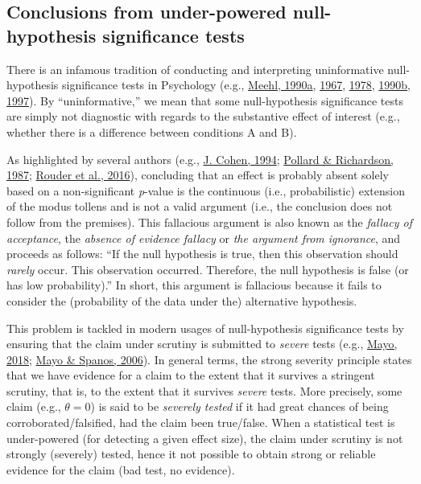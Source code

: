 \documentclass[
  english,
  man, donotrepeattitle,mask,floatsintext]{apa6}
\begin{document}
\hypertarget{conclusions-from-under-powered-null-hypothesis-significance-tests}{%
\subsection{Conclusions from under-powered null-hypothesis significance tests}\label{conclusions-from-under-powered-null-hypothesis-significance-tests}}

There is an infamous tradition of conducting and interpreting uninformative null-hypothesis significance tests in Psychology (e.g., \protect\hyperlink{ref-meehl_appraising_1990-1}{Meehl, 1990a}, \protect\hyperlink{ref-meehl_theory-testing_1967}{1967}, \protect\hyperlink{ref-meehl_theoretical_1978}{1978}, \protect\hyperlink{ref-meehl_why_1990}{1990b}, \protect\hyperlink{ref-harlow_problem_1997}{1997}). By ``uninformative,'' we mean that some null-hypothesis significance tests are simply not diagnostic with regards to the substantive effect of interest (e.g., whether there is a difference between conditions A and B).

As highlighted by several authors (e.g., \protect\hyperlink{ref-cohen_earth_1994}{J. Cohen, 1994}; \protect\hyperlink{ref-pollard_probability_1987}{Pollard \& Richardson, 1987}; \protect\hyperlink{ref-rouder_is_2016}{Rouder et al., 2016}), concluding that an effect is probably absent solely based on a non-significant \emph{p}-value is the continuous (i.e., probabilistic) extension of the modus tollens and is not a valid argument (i.e., the conclusion does not follow from the premises). This fallacious argument is also known as the \emph{fallacy of acceptance}, the \emph{absence of evidence fallacy} or \emph{the argument from ignorance}, and proceeds as follows: ``If the null hypothesis is true, then this observation should \emph{rarely} occur. This observation occurred. Therefore, the null hypothesis is false (or has low probability).'' In short, this argument is fallacious because it fails to consider the (probability of the data under the) alternative hypothesis.

This problem is tackled in modern usages of null-hypothesis significance tests by ensuring that the claim under scrutiny is submitted to \emph{severe} tests (e.g., \protect\hyperlink{ref-mayo_statistical_2018}{Mayo, 2018}; \protect\hyperlink{ref-mayo_severe_2006}{Mayo \& Spanos, 2006}). In general terms, the strong severity principle states that we have evidence for a claim to the extent that it survives a stringent scrutiny, that is, to the extent that it survives \emph{severe} tests. More precisely, some claim (e.g., \(\theta = 0\)) is said to be \emph{severely tested} if it had great chances of being corroborated/falsified, had the claim been true/false. When a statistical test is under-powered (for detecting a given effect size), the claim under scrutiny is not strongly (severely) tested, hence it not possible to obtain strong or reliable evidence for the claim (bad test, no evidence).
\end{document}
